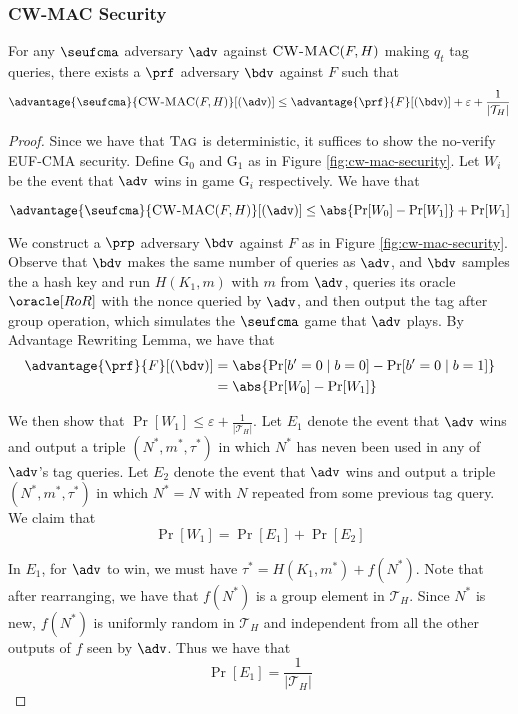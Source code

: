 \documentclass[11pt,a4paper]{article}
\newcommand{\Tag}{\textsc{Tag}}
\begin{document}
\subsubsection{CW-MAC Security}
For any $\seufcma$ adversary $\adv$ against $\textsc{CW-MAC}(F,H)$ making $q_t$ tag queries, there exists a $\prf$ adversary $\bdv$ against $F$ such that 
$$
\advantage{\seufcma}{\textsc{CW-MAC}(F,H)}[(\adv)] \leq \advantage{\prf}{F}[(\bdv)] + \varepsilon + \frac{1}{|\mathcal{T}_H|}
$$

\begin{proof}
Since we have that $\Tag$ is deterministic, it suffices to show the no-verify EUF-CMA security. Define $\mathrm{G}_0$ and $\mathrm{G}_1$ as in Figure \ref{fig:cw-mac-security}. Let $W_i$ be the event that $\adv$ wins in game $\mathrm{G}_i$ respectively. We have that 

$$
\advantage{\seufcma}{\textsc{CW-MAC}(F,H)}[(\adv)] \leq \abs{\Pr[W_0] - \Pr[W_1]} + \Pr[W_1]
$$

We construct a $\prp$ adversary $\bdv$ against $F$ as in Figure \ref{fig:cw-mac-security}. Observe that $\bdv$ makes the same number of queries as $\adv$, and $\bdv$ samples the a hash key and run $H(K_1, m)$ with $m$ from $\adv$, queries its oracle $\oracle[RoR]$ with the nonce queried by $\adv$, and then output the tag after group operation, which simulates the $\seufcma$ game that $\adv$ plays. By Advantage Rewriting Lemma, we have that 
$$
\begin{aligned}
\advantage{\prf}{F}[(\bdv)] 
&= \abs{\Pr[b'=0 \mid b = 0] - \Pr[b'=0 \mid b=1]} \\ 
&= \abs{\Pr[W_0] - \Pr[W_1]}
\end{aligned}
$$

We then show that $\Pr[W_1] \leq \varepsilon + \frac{1}{|\mathcal{T}_H|}$. Let $E_1$ denote the event that $\adv$ wins and output a triple $(N^*, m^*, \tau^*)$ in which $N^*$ has neven been used in any of $\adv$'s tag queries. Let $E_2$ denote the event that $\adv$ wins and output a triple $(N^*, m^*, \tau^*)$ in which $N^* = N$ with $N$ repeated from some previous tag query. We claim that 
$$
\Pr[W_1] = \Pr[E_1] + \Pr[E_2] 
$$

In $E_1$, for $\adv$ to win, we must have $\tau^* = H(K_1, m^*) + f(N^*)$. Note that after rearranging, we have that $f(N^*)$ is a group element in $\mathcal{T}_H$. Since $N^*$ is new, $f(N^*)$ is uniformly random in $\mathcal{T}_H$ and independent from all the other outputs of $f$ seen by $\adv$. Thus we have that 
$$
\Pr[E_1] = \frac{1}{|\mathcal{T}_H|}
$$ 


\end{proof}
\end{document}
